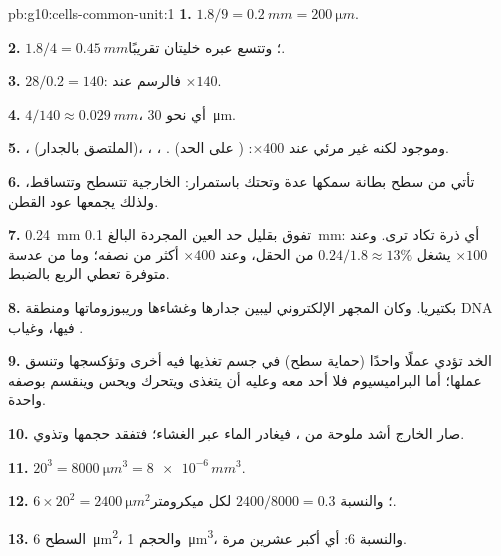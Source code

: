 \begin{solution}{pb:g10:cells-common-unit:1}
\textbf{1.} $1.8/9 = \qty{0.2}{mm} = \qty{200}{\micro m}$.

\textbf{2.} $1.8/4 = \qty{0.45}{mm}$؛ وتتسع عبره خليتان تقريبًا.

\textbf{3.} $28/0.2 = 140$: فالرسم عند $\times 140$.

\textbf{4.} $4/140 \approx \qty{0.029}{mm}$، أي نحو \qty{30}{\micro m}.

\textbf{5.} ،  (الملتصق بالجدار)،
، ، . وموجود لكنه غير مرئي عند $\times 400$:
 ( على الحد).

\textbf{6.} تأتي من سطح بطانة سمكها عدة  وتحتك باستمرار: 
الخارجية تتسطح وتتساقط، ولذلك يجمعها عود القطن.

\textbf{7.} \qty{0.24}{mm} تفوق بقليل حد العين المجردة البالغ
\qty{0.1}{mm}: أي ذرة تكاد ترى. وعند $\times 100$ يشغل
$0.24/1.8 \approx 13\%$ من الحقل، وعند $\times 400$ أكثر من نصفه؛
وما من عدسة متوفرة تعطي الربع بالضبط.

\textbf{8.} بكتيريا. وكان المجهر الإلكتروني ليبين جدارها وغشاءها
وريبوزوماتها ومنطقة DNA فيها، وغياب .

\textbf{9.}  الخد تؤدي عملًا واحدًا (حماية سطح) في جسم تغذيها فيه
 أخرى وتؤكسجها وتنسق عملها؛ أما البراميسيوم فلا أحد معه وعليه أن
يتغذى ويتحرك ويحس وينقسم بوصفه  واحدة.

\textbf{10.} صار الخارج أشد ملوحة من ، فيغادر الماء 
عبر الغشاء؛ فتفقد  حجمها وتذوي.

\textbf{11.} $20^3 = \qty{8000}{\micro m^3} = \num{8e-6}\,\unit{mm^3}$.

\textbf{12.} $6 \times 20^2 = \qty{2400}{\micro m^2}$؛ والنسبة
$2400/8000 = 0.3$ لكل ميكرومتر.

\textbf{13.} السطح \qty{6}{\micro m^2}، والحجم \qty{1}{\micro m^3}،
والنسبة 6: أي أكبر عشرين مرة.


\end{solution}
